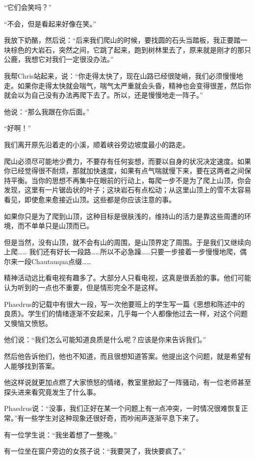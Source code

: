 \documentclass[UTF8]{article}
\begin{document}
\par “它们会笑吗？”
\par “不会，但是看起来好像在笑。”
\par 我放下奶酪，然后说：“后来我们爬山的时候，要找圆的石头当踏板，我正要踏一块棕色的大岩石，突然之间，它跳了起来，跑到树林里去了，原来就是刚才的那只公鹿，我想它对我们一定很没办法。”
\par 我帮Chris站起来，说：“你走得太快了，现在山路已经很陡峭，我们必须慢慢地走。如果你走得太快就会喘气，喘气太严重就会头昏，精神也会变得很差，然后你就会以为自己没有办法再爬下去了。所以，还是慢慢地走一阵子。”
\par 他说：“那么我跟在你后面。”
\par “好啊！”
\par 我们离开原先沿着走的小溪，顺着峡谷旁边坡度最小的路走。
\par 爬山必须尽可能地少费力，不要存有任何妄想，而要以自身的状况决定速度。如果你已经觉得很不耐烦，那就加快速度，如果有点气喘就慢下来，要在这两者之间保持平衡。当你的思想不再集中在眼前的行动上，每爬一步不是为了爬上山顶，你会发现，这里有一片锯齿状的叶子；这块岩石有点松动；从这里山顶上的雪不太容易看见，即使愈来愈接近山顶。这些都是你应该注意的事。
\par 如果你只是为了爬到山顶，这种目标是很肤浅的，维持山的活力是靠这些周遭的环境，而不单单只是山顶而已。
\par 但是当然，没有山顶，就不会有山的周围，是山顶界定了周围。于是我们又继续向上爬…… 我们还有好长一段路……所以不必急躁……只要一步接着一步慢慢地爬，偶尔来一段Chautauqua点缀……
\par 精神活动远比看电视有趣多了。大部分人只看电视，这真是很丢脸的事。他们可能认为听到的一点也不重要，但是情形完全不是这样。
\par Phaedrus的记载中有很大一段，写一次他要班上的学生写一篇《思想和陈述中的良质》。学生们的情绪逐渐不安起来，几乎每一个人都像他过去一样，对这个问题又懊恼又愤怒。
\par 他们说：“我们怎么可能知道良质是什么呢？应该是你来告诉我们。”
\par 然后他告诉他们，他也不知道，而且很想知道答案。他提出这个问题，就是希望有人能够找到答案。
\par 他这样说就更加点燃了大家愤怒的情绪，教室里掀起了一阵骚动，有一位老师甚至探头进来看究竟发生了什么事。
\par Phaedrus说：“没事，我们正好在某一个问题上有一点冲突，一时情况很难恢复正常。”有一些学生对这种现象还很好奇，而吵闹声逐渐平息下来了。
\par 有一位学生说：“我坐着想了一整晚。”
\par 有一位坐在窗户旁边的女孩子说：“我要哭了，我快要疯了。”
\end{document}
